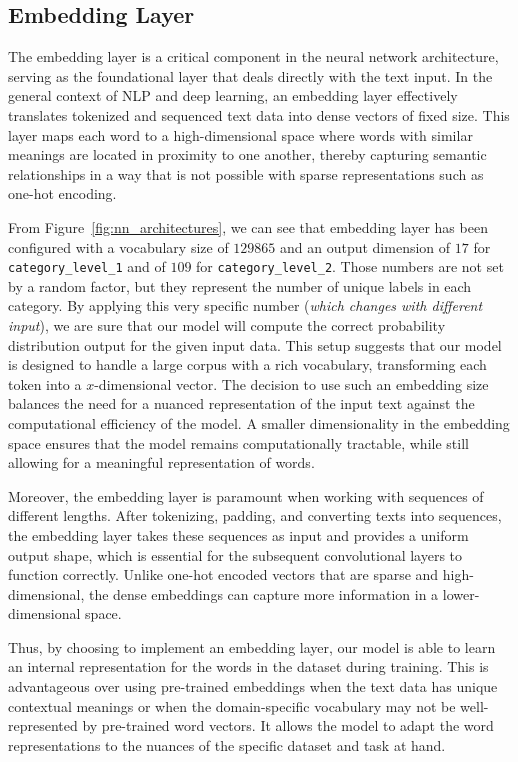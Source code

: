 \subsection{Embedding Layer}
The embedding layer is a critical component in the neural network architecture, serving as the foundational layer that deals directly with the text input. In the general context of NLP and deep learning, an embedding layer effectively translates tokenized and sequenced text data into dense vectors of fixed size. This layer maps each word to a high-dimensional space where words with similar meanings are located in proximity to one another, thereby capturing semantic relationships in a way that is not possible with sparse representations such as one-hot encoding.

From Figure~\ref{fig:nn_architectures}, we can see that embedding layer has been configured with a vocabulary size of $\num{129865}$ and an output dimension of $17$ for \verb|category_level_1| and of $109$ for \verb|category_level_2|. Those numbers are not set by a random factor, but they represent the number of unique labels in each category. By applying this very specific number (\textit{which changes with different input}), we are sure that our model will compute the correct probability distribution output for the given input data. This setup suggests that our model is designed to handle a large corpus with a rich vocabulary, transforming each token into a $x$-dimensional vector. The decision to use such an embedding size balances the need for a nuanced representation of the input text against the computational efficiency of the model. A smaller dimensionality in the embedding space ensures that the model remains computationally tractable, while still allowing for a meaningful representation of words.

Moreover, the embedding layer is paramount when working with sequences of different lengths. After tokenizing, padding, and converting texts into sequences, the embedding layer takes these sequences as input and provides a uniform output shape, which is essential for the subsequent convolutional layers to function correctly. Unlike one-hot encoded vectors that are sparse and high-dimensional, the dense embeddings can capture more information in a lower-dimensional space.

Thus, by choosing to implement an embedding layer, our model is able to learn an internal representation for the words in the dataset during training. This is advantageous over using pre-trained embeddings when the text data has unique contextual meanings or when the domain-specific vocabulary may not be well-represented by pre-trained word vectors. It allows the model to adapt the word representations to the nuances of the specific dataset and task at hand.


